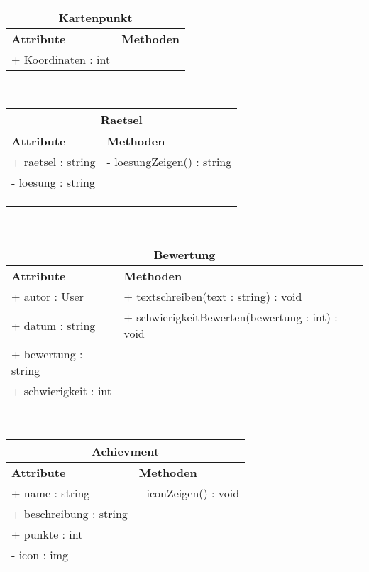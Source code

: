 \documentclass[a4paper, 12pt]{article}
\begin{document}
\begin{tabular}{ | p{5.5cm} | p{8cm} |}
\multicolumn{2}{c}{\textbf{Kartenpunkt}}\\ \hline
\textbf{Attribute} & \textbf{Methoden} \\ \hline
+ Koordinaten : int &  \\ \hline
\end{tabular}\\[1\baselineskip]

\begin{tabular}{ | p{5.5cm} | p{8cm} |}
\multicolumn{2}{c}{\textbf{Raetsel}}\\ \hline
\textbf{Attribute} & \textbf{Methoden} \\ \hline
+ raetsel : string & - loesungZeigen() : string \\ \hline
- loesung : string &  \\ \hline
 &  \\ \hline
 &  \\ \hline
 &  \\ \hline
\end{tabular}\\[1\baselineskip]

\begin{tabular}{ | p{5.5cm} | p{8cm} |}
\multicolumn{2}{c}{\textbf{Bewertung}}\\ \hline
\textbf{Attribute} & \textbf{Methoden} \\ \hline
+ autor : User & + textschreiben(text : string) : void \\ \hline
+ datum : string & + schwierigkeitBewerten(bewertung : int) : void \\ \hline
+ bewertung : string &  \\ \hline
+ schwierigkeit : int &  \\ \hline
\end{tabular}\\[1\baselineskip]

\begin{tabular}{ | p{5.5cm} | p{8cm} |}
\multicolumn{2}{c}{\textbf{Achievment}}\\ \hline
\textbf{Attribute} & \textbf{Methoden} \\ \hline
+ name : string & - iconZeigen() : void \\ \hline
+ beschreibung : string &  \\ \hline
+ punkte : int &  \\ \hline
- icon : img &  \\ \hline
\end{tabular}\\[1\baselineskip]
\end{document}
